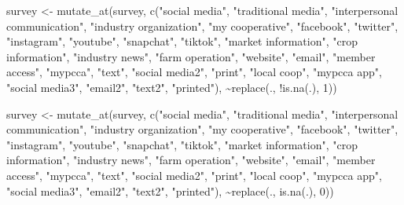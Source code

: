 \documentclass[
]{article}
\newenvironment{Shaded}{\begin{snugshade}}{\end{snugshade}}
\newcommand{\DecValTok}[1]{\textcolor[rgb]{0.00,0.00,0.81}{#1}}
\newcommand{\FunctionTok}[1]{\textcolor[rgb]{0.00,0.00,0.00}{#1}}
\newcommand{\NormalTok}[1]{#1}
\newcommand{\OtherTok}[1]{\textcolor[rgb]{0.56,0.35,0.01}{#1}}
\newcommand{\SpecialCharTok}[1]{\textcolor[rgb]{0.00,0.00,0.00}{#1}}
\newcommand{\StringTok}[1]{\textcolor[rgb]{0.31,0.60,0.02}{#1}}
\begin{document}
\begin{Shaded}
\begin{Highlighting}[]
\NormalTok{survey }\OtherTok{\textless{}{-}} \FunctionTok{mutate\_at}\NormalTok{(survey, }\FunctionTok{c}\NormalTok{(}\StringTok{"social media"}\NormalTok{, }\StringTok{"traditional media"}\NormalTok{,}
    \StringTok{"interpersonal communication"}\NormalTok{, }\StringTok{"industry organization"}\NormalTok{, }\StringTok{"my cooperative"}\NormalTok{,}
    \StringTok{"facebook"}\NormalTok{, }\StringTok{"twitter"}\NormalTok{, }\StringTok{"instagram"}\NormalTok{, }\StringTok{"youtube"}\NormalTok{, }\StringTok{"snapchat"}\NormalTok{,}
    \StringTok{"tiktok"}\NormalTok{, }\StringTok{"market information"}\NormalTok{, }\StringTok{"crop information"}\NormalTok{, }\StringTok{"industry news"}\NormalTok{,}
    \StringTok{"farm operation"}\NormalTok{, }\StringTok{"website"}\NormalTok{, }\StringTok{"email"}\NormalTok{, }\StringTok{"member access"}\NormalTok{, }\StringTok{"mypcca"}\NormalTok{,}
    \StringTok{"text"}\NormalTok{, }\StringTok{"social media2"}\NormalTok{, }\StringTok{"print"}\NormalTok{, }\StringTok{"local coop"}\NormalTok{, }\StringTok{"mypcca app"}\NormalTok{,}
    \StringTok{"social media3"}\NormalTok{, }\StringTok{"email2"}\NormalTok{, }\StringTok{"text2"}\NormalTok{, }\StringTok{"printed"}\NormalTok{), }\SpecialCharTok{\textasciitilde{}}\FunctionTok{replace}\NormalTok{(.,}
    \SpecialCharTok{!}\FunctionTok{is.na}\NormalTok{(.), }\DecValTok{1}\NormalTok{))}

\NormalTok{survey }\OtherTok{\textless{}{-}} \FunctionTok{mutate\_at}\NormalTok{(survey, }\FunctionTok{c}\NormalTok{(}\StringTok{"social media"}\NormalTok{, }\StringTok{"traditional media"}\NormalTok{,}
    \StringTok{"interpersonal communication"}\NormalTok{, }\StringTok{"industry organization"}\NormalTok{, }\StringTok{"my cooperative"}\NormalTok{,}
    \StringTok{"facebook"}\NormalTok{, }\StringTok{"twitter"}\NormalTok{, }\StringTok{"instagram"}\NormalTok{, }\StringTok{"youtube"}\NormalTok{, }\StringTok{"snapchat"}\NormalTok{,}
    \StringTok{"tiktok"}\NormalTok{, }\StringTok{"market information"}\NormalTok{, }\StringTok{"crop information"}\NormalTok{, }\StringTok{"industry news"}\NormalTok{,}
    \StringTok{"farm operation"}\NormalTok{, }\StringTok{"website"}\NormalTok{, }\StringTok{"email"}\NormalTok{, }\StringTok{"member access"}\NormalTok{, }\StringTok{"mypcca"}\NormalTok{,}
    \StringTok{"text"}\NormalTok{, }\StringTok{"social media2"}\NormalTok{, }\StringTok{"print"}\NormalTok{, }\StringTok{"local coop"}\NormalTok{, }\StringTok{"mypcca app"}\NormalTok{,}
    \StringTok{"social media3"}\NormalTok{, }\StringTok{"email2"}\NormalTok{, }\StringTok{"text2"}\NormalTok{, }\StringTok{"printed"}\NormalTok{), }\SpecialCharTok{\textasciitilde{}}\FunctionTok{replace}\NormalTok{(.,}
    \FunctionTok{is.na}\NormalTok{(.), }\DecValTok{0}\NormalTok{))}
\end{Highlighting}
\end{Shaded}
\end{document}
